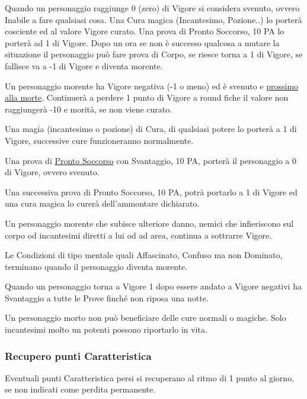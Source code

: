 \documentclass[12pt,a4paper,twoside,openany]{book}
\begin{document}
\begin{multicols}{2}

Quando un personaggio raggiunge 0 (zero) di Vigore si considera svenuto, ovvero Inabile a fare qualsiasi cosa. Una Cura magica (Incantesimo, Pozione..) lo porterà cosciente ed al valore Vigore curato. Una prova di Pronto Soccorso, 10 PA lo porterà ad 1 di Vigore. Dopo un ora se non è successo qualcosa a mutare la situazione il personaggio può fare prova di Corpo, se riesce torna a 1 di Vigore, se fallisce va a -1 di Vigore e diventa morente.

Un personaggio morente ha Vigore negativa (-1 o meno) ed è svenuto e \hyperlink{morente}{prossimo alla morte}. Continuerà a perdere 1 punto di Vigore a round fiche il valore non raggiungerà -10 e morità, se non viene curato.

Una magia (incantesimo o pozione) di Cura, di qualsiasi potere lo porterà a 1 di Vigore, successive cure funzioneranno normalmente.

Una prova di \hyperlink{prontosoccorso}{Pronto Soccorso} con Svantaggio, 10 PA, porterà il personaggio a 0 di Vigore, ovvero svenuto. 

Una successiva prova di Pronto Soccorso, 10 PA, potrà portarlo a 1 di Vigore ed una cura magica lo curerà dell'ammontare dichiarato.

Un personaggio morente che subisce ulteriore danno, nemici che infieriscono sul corpo od incantesimi diretti a lui od ad area, continua a sottrarre Vigore. 

Le Condizioni di tipo mentale quali Affascinato, Confuso ma non Dominato, terminano quando il personaggio diventa morente.

Quando un personaggio torna a Vigore 1 dopo essere andato a Vigore negativi ha Svantaggio a tutte le Prove finché non riposa una notte.

Un personaggio morto non può beneficiare delle cure normali o magiche. Solo incantesimi molto un potenti possono riportarlo in vita.

\subsubsection{Recupero punti Caratteristica}\label{recuperopunticcaratteristica}

Eventuali punti Caratteristica persi si recuperano al ritmo di 1 punto al giorno, se non indicati come perdita permanente.


\end{multicols}
\end{document}
